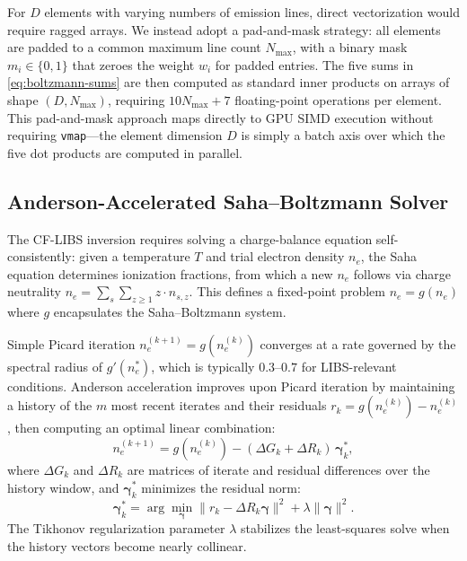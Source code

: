 \documentclass[preprint,12pt,authoryear]{elsarticle}
\begin{document}
For $D$ elements with varying numbers of emission lines, direct vectorization would require ragged arrays.
We instead adopt a pad-and-mask strategy: all elements are padded to a common maximum line count $N_\mathrm{max}$, with a binary mask $m_i \in \{0, 1\}$ that zeroes the weight $w_i$ for padded entries.
The five sums in \cref{eq:boltzmann-sums} are then computed as standard inner products on arrays of shape $(D, N_\mathrm{max})$, requiring $10 N_\mathrm{max} + 7$ floating-point operations per element.
This pad-and-mask approach maps directly to GPU SIMD execution without requiring \texttt{vmap}---the element dimension $D$ is simply a batch axis over which the five dot products are computed in parallel.

\subsection{Anderson-Accelerated Saha--Boltzmann Solver}
\label{sec:anderson}

The CF-LIBS inversion requires solving a charge-balance equation self-consistently: given a temperature $T$ and trial electron density $n_e$, the Saha equation determines ionization fractions, from which a new $n_e$ follows via charge neutrality $n_e = \sum_s \sum_{z \geq 1} z \cdot n_{s,z}$.
This defines a fixed-point problem $n_e = g(n_e)$ where $g$ encapsulates the Saha--Boltzmann system.

Simple Picard iteration $n_e^{(k+1)} = g(n_e^{(k)})$ converges at a rate governed by the spectral radius of $g'(n_e^*)$, which is typically $0.3$--$0.7$ for LIBS-relevant conditions.
Anderson acceleration \citep{Walker2011} improves upon Picard iteration by maintaining a history of the $m$ most recent iterates and their residuals $r_k = g(n_e^{(k)}) - n_e^{(k)}$, then computing an optimal linear combination:
\begin{equation}
  n_e^{(k+1)} = g(n_e^{(k)}) - (\Delta G_k + \Delta R_k)\, \bm{\gamma}_k^*,
  \label{eq:anderson}
\end{equation}
where $\Delta G_k$ and $\Delta R_k$ are matrices of iterate and residual differences over the history window, and $\bm{\gamma}_k^*$ minimizes the residual norm:
\begin{equation}
  \bm{\gamma}_k^* = \arg\min_{\bm{\gamma}} \| r_k - \Delta R_k \bm{\gamma} \|^2 + \lambda \|\bm{\gamma}\|^2.
  \label{eq:anderson-ls}
\end{equation}
The Tikhonov regularization parameter $\lambda$ stabilizes the least-squares solve when the history vectors become nearly collinear.
\end{document}

